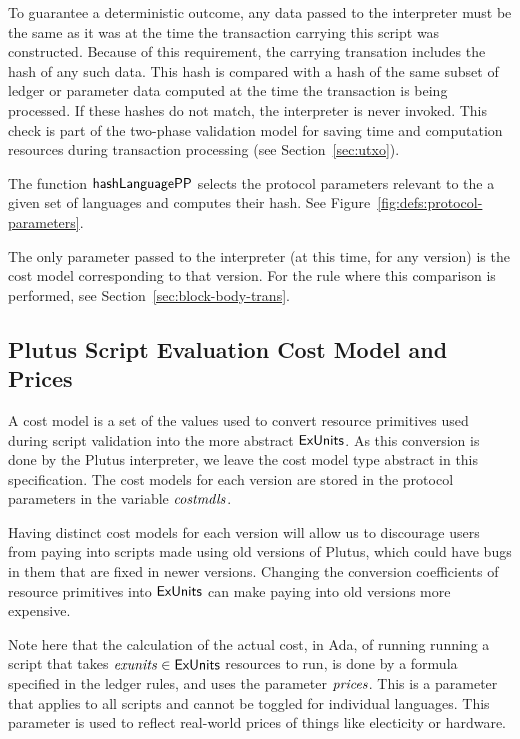 To guarantee a deterministic outcome,
any data passed to the interpreter must be
the same as it was at the time the transaction carrying this script was
constructed.
Because of this requirement, the carrying transation includes the hash of any such data.
This hash is compared with
a hash of the same subset of ledger or parameter data computed at the time the transaction is being
processed. If these hashes do not match, the interpreter is never invoked.
This check is part of the two-phase validation model for saving time and computation
resources during transaction processing (see Section~\ref{sec:utxo}).

The function $\mathsf{hashLanguagePP}$ selects the protocol parameters relevant to
the a given set of languages and computes their hash.
See Figure~\ref{fig:defs:protocol-parameters}.

The only parameter passed to the interpreter (at this time, for any version) is the cost model
corresponding to that version. For the rule
where this comparison is performed, see Section~\ref{sec:block-body-trans}.

\subsection{Plutus Script Evaluation Cost Model and Prices}
\label{sec:cost-mod}

A cost model is a set of the values used to convert resource
primitives used during script validation into the
more abstract $\mathsf{ExUnits}$. As this conversion is done by the Plutus interpreter,
we leave the cost model type abstract in this specification.
The cost models for each version are stored in the protocol
parameters in the variable $\mathit{costmdls}$.

Having distinct cost models for each version will allow us to discourage users from
paying into scripts made using old versions of Plutus, which could have bugs
in them that are fixed in newer versions. Changing the conversion coefficients
of resource primitives into $\mathsf{ExUnits}$ can make paying into old versions
more expensive.

Note here that the calculation of the actual cost, in Ada, of running
running a script that takes $\mathit{exunits} \in \mathsf{ExUnits}$ resources to run,
is done by a formula specified in the ledger rules, and uses the parameter
$\mathit{prices}$. This is a parameter that applies to all
scripts and cannot be toggled for individual languages. This parameter is
used to reflect real-world prices of things like electicity or hardware.

